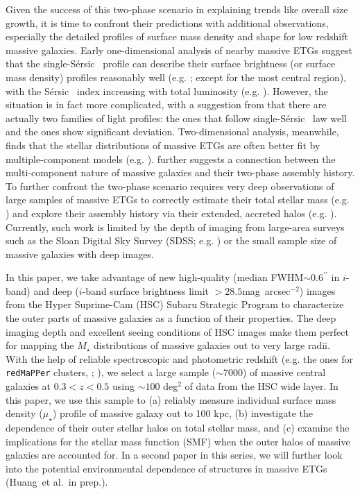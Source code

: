 \documentclass[a4paper,fleqn,usenatbib]{mnras}
\def\arcsec{{\prime\prime}}
\def\sb{mag~arcsec$^{-2}$}
\def\etal{{\ et al.~}}
\def\ser{{S\'{e}rsic\ }}
\def\redm{\texttt{redMaPPer}}
\def\mstar{{$M_{\star}$}}
\def\mden{{$\mu_{\star}$}}
\begin{document}
    Given the success of this two-phase scenario in explaining trends like overall size 
    growth, it is time to confront their predictions with additional observations, 
    especially the detailed profiles of surface mass density and shape for low redshift 
    massive galaxies.  
    Early one-dimensional analysis of nearby massive ETGs suggest that the 
    single-\ser{} profile can describe their surface brightness (or surface mass 
    density) profiles reasonably well (e.g. \citealt{Kormendy2009}; except for the
    most central region), with the \ser{} index increasing with total luminosity 
    (e.g. \citealt{Graham2013}).
	However, the situation is in fact more complicated, with a suggestion from 
	\citet{Schombert2015} that there are actually two families of light profiles:
	the ones that follow single-\ser{} law well and the ones show significant 
	deviation.
	Two-dimensional analysis, meanwhile, finds that the stellar distributions 
    of massive ETGs are often better fit by multiple-component models 
    (e.g. \citealt{Huang2013a, Oh2017}). 
    \citet{Huang2013b} further suggests a connection between the multi-component 
    nature of massive galaxies and their two-phase assembly history. 
    To further confront the two-phase scenario requires very deep observations of 
    large samples of massive ETGs to correctly estimate their total stellar mass 
    (e.g. \citealt{Bernardi2013, DSouza2014}) and explore their assembly history via 
    their extended, accreted halos (e.g. \citealt{Capaccioli2015, Iodice2016, 
    Iodice2017}).
    Currently, such work is limited by the depth of imaging from large-area surveys 
    such as the Sloan Digital Sky Survey (SDSS; e.g. \citealt{SDSSDR7, SDSSDR12}) or
    the small sample size of massive galaxies with deep images.  
    
    In this paper, we take advantage of new high-quality (median 
    FWHM${\sim} 0.6^{\arcsec}$ in $i$-band) and deep ($i$-band surface brightness 
    limit $> 28.5$\sb) images from the Hyper Suprime-Cam (HSC) Subaru Strategic 
    Program \citep[SSP,][]{HSCDR1} to characterize the outer parts of massive galaxies 
    as a function of their properties. 
    The deep imaging depth and excellent seeing conditions of HSC images make them 
    perfect for mapping the \mstar{} distributions of massive galaxies out to very 
    large radii. 
    With the help of reliable spectroscopic and photometric redshift 
    (e.g. the ones for \redm{} clusters, \citealt{Rykoff2014}; \citealt{Rozo2015b}),
    we select a large sample (${\sim} 7000$) of massive central galaxies at 
    $0.3 < z < 0.5$ using ${\sim} 100$ deg$^2$ of data from the HSC wide layer. 
    In this paper, we use this sample to 
    (a) reliably measure individual surface mass density (\mden{}) profile of 
    massive galaxy out to 100 kpc, 
    (b) investigate the dependence of their outer stellar halos on total stellar 
    mass, and 
    (c) examine the implications for the stellar mass function (SMF) when the outer 
    halos of massive galaxies are accounted for.   
    In a second paper in this series, we will further look into the potential 
    environmental dependence of structures in massive ETGs (Huang\etal in prep.).
    
\end{document}
